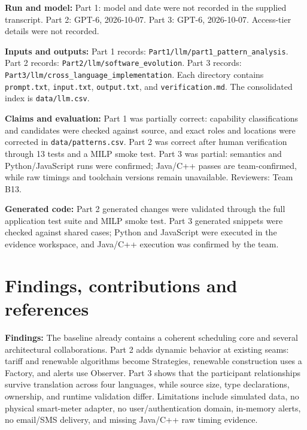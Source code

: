 \documentclass[11pt,a4paper]{article}
\newcommand{\entry}[2]{\textbf{#1:} #2\par}
\newcommand{\codepath}[1]{\nolinkurl{#1}}
\begin{document}
\entry{Run and model}{Part 1: model and date were not recorded in the supplied transcript. Part 2: GPT-6, 2026-10-07. Part 3: GPT-6, 2026-10-07. Access-tier details were not recorded.}
\entry{Inputs and outputs}{Part 1 records: \codepath{Part1/llm/part1_pattern_analysis}. Part 2 records: \codepath{Part2/llm/software_evolution}. Part 3 records: \codepath{Part3/llm/cross_language_implementation}. Each directory contains \codepath{prompt.txt}, \codepath{input.txt}, \codepath{output.txt}, and \codepath{verification.md}. The consolidated index is \codepath{data/llm.csv}.}
\entry{Claims and evaluation}{Part 1 was partially correct: capability classifications and candidates were checked against source, and exact roles and locations were corrected in \codepath{data/patterns.csv}. Part 2 was correct after human verification through 13 tests and a MILP smoke test. Part 3 was partial: semantics and Python/JavaScript runs were confirmed; Java/C++ passes are team-confirmed, while raw timings and toolchain versions remain unavailable. Reviewers: Team B13.}
\entry{Generated code}{Part 2 generated changes were validated through the full application test suite and MILP smoke test. Part 3 generated snippets were checked against shared cases; Python and JavaScript were executed in the evidence workspace, and Java/C++ execution was confirmed by the team.}

\section{Findings, contributions and references}

\entry{Findings}{The baseline already contains a coherent scheduling core and several architectural collaborations. Part 2 adds dynamic behavior at existing seams: tariff and renewable algorithms become Strategies, renewable construction uses a Factory, and alerts use Observer. Part 3 shows that the participant relationships survive translation across four languages, while source size, type declarations, ownership, and runtime validation differ. Limitations include simulated data, no physical smart-meter adapter, no user/authentication domain, in-memory alerts, no email/SMS delivery, and missing Java/C++ raw timing evidence.}
\end{document}
